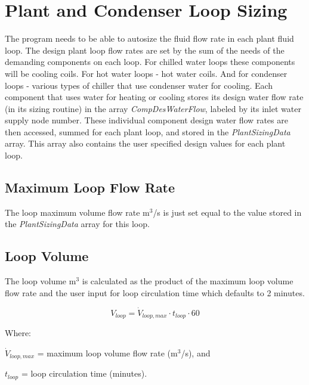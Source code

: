 \section{Plant and Condenser Loop Sizing}\label{plant-condenser-loop-sizing}

The program needs to be able to autosize the fluid flow rate in each plant fluid loop. The design plant loop flow rates are set by the sum of the needs of the demanding components on each loop. For chilled water loops these components will be cooling coils. For hot water loops - hot water coils. And for condenser loops - various types of chiller that use condenser water for cooling. Each component that uses water for heating or cooling stores its design water flow rate (in its sizing routine) in the array \emph{CompDesWaterFlow}, labeled by its inlet water supply node number. These individual component design water flow rates are then accessed, summed for each plant loop, and stored in the \emph{PlantSizingData} array. This array also contains the user specified design values for each plant loop.

\subsection{Maximum Loop Flow Rate}\label{maximum-loop-flow-rate}

The loop maximum volume flow rate m\(^{3}\)/s is just set equal to the value stored in the \emph{PlantSizingData} array for this loop.

\subsection{Loop Volume}\label{volume-of-the-plant-loop}

The loop volume m\(^{3}\) is calculated as the product of the maximum loop volume flow rate and the user input for loop circulation time which defaults to 2 minutes.

\begin{equation}
V_{loop} = \dot{V}_{loop,max} \cdot t_{loop} \cdot 60
\end{equation}

Where:

\(\dot{V}_{loop,max}\) = maximum loop volume flow rate  (m\(^{3}\)/s), and
 
\(t_{loop}\) = loop circulation time (minutes).
